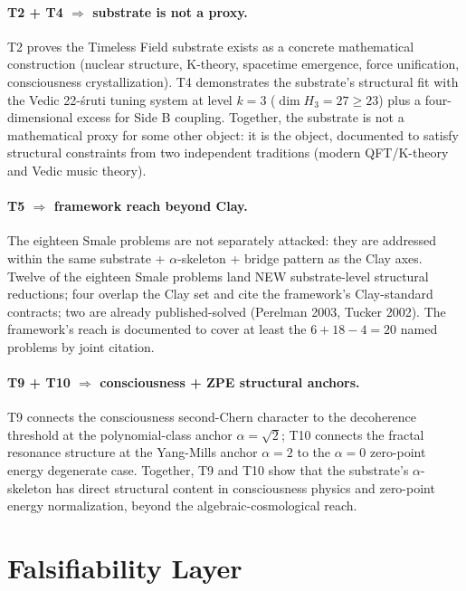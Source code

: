 \documentclass[11pt,a4paper]{article}
\theoremstyle{definition}
\begin{document}
\paragraph{T2 + T4 \(\Rightarrow\) substrate is not a proxy.} T2
proves the Timeless Field substrate exists as a concrete
mathematical construction (nuclear structure, K-theory, spacetime
emergence, force unification, consciousness crystallization). T4
demonstrates the substrate's structural fit with the Vedic 22-\'sruti
tuning system at level $k = 3$ ($\dim H_3 = 27 \geq 23$) plus a
four-dimensional excess for Side B coupling. Together, the substrate
is not a mathematical proxy for some other object: it is the object,
documented to satisfy structural constraints from two independent
traditions (modern QFT/K-theory and Vedic music theory).

\paragraph{T5 \(\Rightarrow\) framework reach beyond Clay.} The
eighteen Smale problems are not separately attacked: they are
addressed within the same substrate + $\alpha$-skeleton + bridge
pattern as the Clay axes. Twelve of the eighteen Smale problems
land NEW substrate-level structural reductions; four overlap the
Clay set and cite the framework's Clay-standard contracts; two are
already published-solved (Perelman 2003, Tucker 2002). The
framework's reach is documented to cover at least the
$6 + 18 - 4 = 20$ named problems by joint citation.

\paragraph{T9 + T10 \(\Rightarrow\) consciousness + ZPE
structural anchors.} T9 connects the consciousness second-Chern
character to the decoherence threshold at the polynomial-class
anchor $\alpha = \sqrt{2}$; T10 connects the fractal resonance
structure at the Yang-Mills anchor $\alpha = 2$ to the $\alpha = 0$
zero-point energy degenerate case. Together, T9 and T10 show that
the substrate's $\alpha$-skeleton has direct structural content in
consciousness physics and zero-point energy normalization, beyond
the algebraic-cosmological reach.

\section{Falsifiability Layer}
\label{sec:falsifiability}
\end{document}
